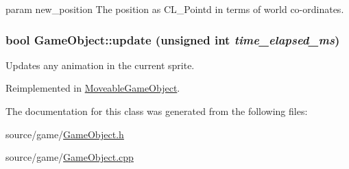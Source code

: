 param new\_\-position The position as CL\_\-Pointd in terms of world co-\/ordinates. \hypertarget{classGameObject_ad2f3cd5d1f5a11b237507cd3ee98b95d}{
\subsubsection[{update}]{\setlength{\rightskip}{0pt plus 5cm}bool GameObject::update (unsigned int {\em time\_\-elapsed\_\-ms})}}
\label{classGameObject_ad2f3cd5d1f5a11b237507cd3ee98b95d}
Updates any animation in the current sprite. 

Reimplemented in \hyperlink{classMoveableGameObject_af2a5d981743e85b4bd35a90f874b361b}{MoveableGameObject}.

The documentation for this class was generated from the following files:\begin{DoxyCompactItemize}
\item 
source/game/\hyperlink{GameObject_8h}{GameObject.h}\item 
source/game/\hyperlink{GameObject_8cpp}{GameObject.cpp}\end{DoxyCompactItemize}
